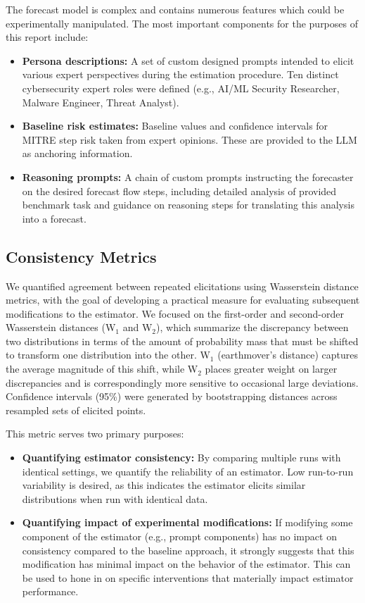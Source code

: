 \documentclass[midterm]{sparreport}
\begin{document}
The forecast model is complex and contains numerous features which could be experimentally manipulated. The most important components for the purposes of this report include:

\begin{itemize}
\item \textbf{Persona descriptions:} A set of custom designed prompts intended to elicit various expert perspectives during the estimation procedure. Ten distinct cybersecurity expert roles were defined (e.g., AI/ML Security Researcher, Malware Engineer, Threat Analyst).
\item \textbf{Baseline risk estimates:} Baseline values and confidence intervals for MITRE step risk taken from expert opinions. These are provided to the LLM as anchoring information.
\item \textbf{Reasoning prompts:} A chain of custom prompts instructing the forecaster on the desired forecast flow steps, including detailed analysis of provided benchmark task and guidance on reasoning steps for translating this analysis into a forecast.
\end{itemize}

\subsection{Consistency Metrics}

We quantified agreement between repeated elicitations using Wasserstein distance metrics, with the goal of developing a practical measure for evaluating subsequent modifications to the estimator. We focused on the first-order and second-order Wasserstein distances (W$_1$ and W$_2$), which summarize the discrepancy between two distributions in terms of the amount of probability mass that must be shifted to transform one distribution into the other. W$_1$ (earthmover's distance) captures the average magnitude of this shift, while W$_2$ places greater weight on larger discrepancies and is correspondingly more sensitive to occasional large deviations. Confidence intervals (95\%) were generated by bootstrapping distances across resampled sets of elicited points.

This metric serves two primary purposes:

\begin{itemize}
\item \textbf{Quantifying estimator consistency:} By comparing multiple runs with identical settings, we quantify the reliability of an estimator. Low run-to-run variability is desired, as this indicates the estimator elicits similar distributions when run with identical data.
\item \textbf{Quantifying impact of experimental modifications:} If modifying some component of the estimator (e.g., prompt components) has no impact on consistency compared to the baseline approach, it strongly suggests that this modification has minimal impact on the behavior of the estimator. This can be used to hone in on specific interventions that materially impact estimator performance.
\end{itemize}
\end{document}
